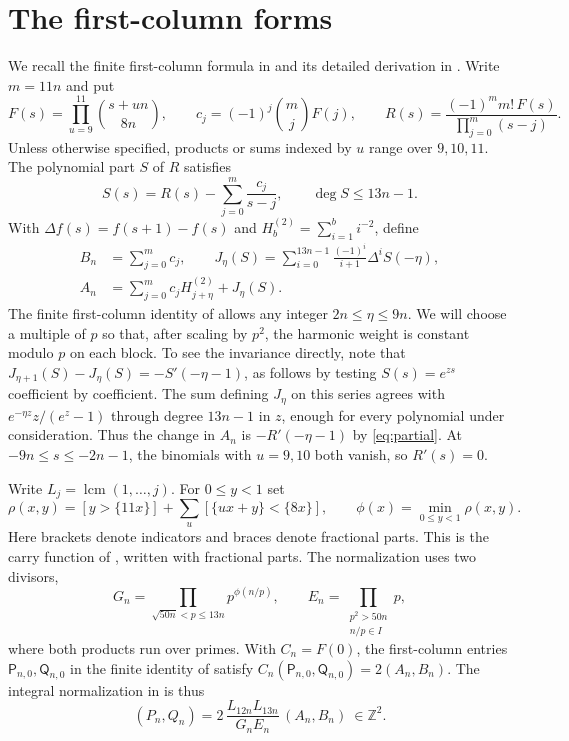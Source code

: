 \documentclass[11pt]{article}
\begin{document}
\section{The first-column forms}
We recall the finite first-column formula in \cite[\S6 and Appendix B]{L}
and its detailed derivation in \cite{LC}. Write $m=11n$ and put
\[
 F(s)=\prod_{u=9}^{11}\binom{s+un}{8n},\qquad
 c_j=(-1)^j\binom mj F(j),\qquad
 R(s)=\frac{(-1)^m m!\,F(s)}{\prod_{j=0}^{m}(s-j)} .
\]
Unless otherwise specified, products or sums indexed by $u$ range
over $9,10,11$. The polynomial part $S$ of $R$ satisfies
\begin{equation}\label{eq:partial}
 S(s)=R(s)-\sum_{j=0}^m\frac{c_j}{s-j},\qquad \deg S\le13n-1 .
\end{equation}
With $\Delta f(s)=f(s+1)-f(s)$ and $H_b^{(2)}=\sum_{i=1}^b i^{-2}$,
define
\begin{align}
 B_n&=\sum_{j=0}^m c_j,\qquad
 J_\eta(S)=\sum_{i=0}^{13n-1}\frac{(-1)^i}{i+1}\Delta^i S(-\eta),
 \nonumber\\
 A_n&=\sum_{j=0}^m c_j H_{j+\eta}^{(2)}+J_\eta(S).
 \label{eq:finite}
\end{align}
The finite first-column identity of \cite{LC} allows any integer
$2n\le\eta\le9n$. We will choose a multiple of $p$ so that, after
scaling by $p^2$, the harmonic weight is constant modulo $p$ on each block. To see the invariance directly, note that
$J_{\eta+1}(S)-J_\eta(S)=-S'(-\eta-1)$, as follows by testing
$S(s)=e^{zs}$ coefficient by coefficient. The sum defining $J_\eta$
on this series agrees with $e^{-\eta z}z/(e^z-1)$ through degree
$13n-1$ in $z$, enough for every polynomial under consideration.
Thus the change in $A_n$
is $-R'(-\eta-1)$ by \eqref{eq:partial}. At
$-9n\le s\le-2n-1$, the binomials with $u=9,10$ both vanish, so
$R'(s)=0$.

Write $L_j=\operatorname{lcm}(1,\ldots,j)$. For $0\le y<1$ set
\[
 \rho(x,y)=[y>\{11x\}]+\sum_u[\{ux+y\}<\{8x\}],\qquad
 \phi(x)=\min_{0\le y<1}\rho(x,y).
\]
Here brackets denote indicators and braces denote fractional parts.
This is the carry function of \cite{L}, written with fractional
parts. The normalization uses two divisors,
\[
 G_n=\prod_{\sqrt{50n}<p\le13n}p^{\phi(n/p)},\qquad
 E_n=\prod_{\substack{p^2>50n\\ n/p\in I}}p ,
\]
where both products run over primes. With $C_n=F(0)$, the
first-column entries $\mathsf P_{n,0},\mathsf Q_{n,0}$ in the finite
identity of \cite{LC} satisfy
$C_n(\mathsf P_{n,0},\mathsf Q_{n,0})=2(A_n,B_n)$.
The integral normalization in \cite[Lemmas 6.20--6.21]{L} is thus
\begin{equation}\label{eq:pq}
 (P_n,Q_n)=2\,\frac{L_{12n}L_{13n}}{G_nE_n}\,(A_n,B_n)\ \in\mathbb Z^2 .
\end{equation}
\end{document}
